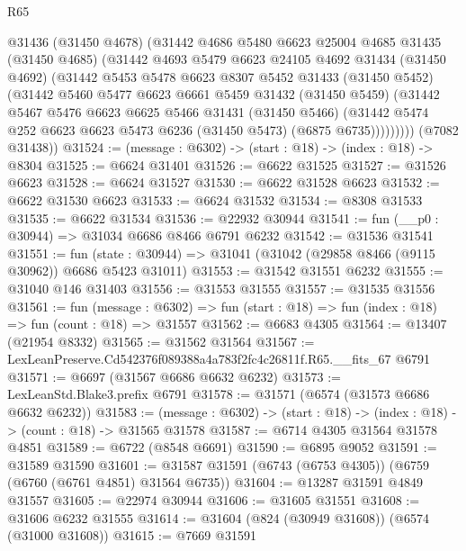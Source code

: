 \begin{lexlean}{R65}
\begin{coremodule}
{          @31436
          (@31450 @4678)
          (@31442
            @4686
            @5480
            @6623
            @25004
            @4685
            @31435
            (@31450 @4685)
            (@31442
              @4693
              @5479
              @6623
              @24105
              @4692
              @31434
              (@31450 @4692)
              (@31442
                @5453
                @5478
                @6623
                @8307
                @5452
                @31433
                (@31450 @5452)
                (@31442
                  @5460
                  @5477
                  @6623
                  @6661
                  @5459
                  @31432
                  (@31450 @5459)
                  (@31442
                    @5467
                    @5476
                    @6623
                    @6625
                    @5466
                    @31431
                    (@31450 @5466)
                    (@31442 @5474 @252 @6623 @6623 @5473 @6236 (@31450 @5473) (@6875 @6735)))))))))
      (@7082 @31438))
@31524 := (message : @6302) -> (start : @18) -> (index : @18) -> @8304
@31525 := @6624 @31401
@31526 := @6622 @31525
@31527 := @31526 @6623
@31528 := @6624 @31527
@31530 := @6622 @31528 @6623
@31532 := @6622 @31530 @6623
@31533 := @6624 @31532
@31534 := @8308 @31533
@31535 := @6622 @31534
@31536 := @22932 @30944
@31541 := fun (__p0 : @30944) => @31034 @6686 @8466 @6791 @6232
@31542 := @31536 @31541
@31551 := fun (state : @30944) => @31041 (@31042 (@29858 @8466 (@9115 @30962)) @6686 @5423 @31011)
@31553 := @31542 @31551 @6232
@31555 := @31040 @146 @31403
@31556 := @31553 @31555
@31557 := @31535 @31556
@31561 := fun (message : @6302) =>
  fun (start : @18) => fun (index : @18) => fun (count : @18) => @31557
@31562 := @6683 @4305
@31564 := @13407 (@21954 @8332)
@31565 := @31562 @31564
@31567 := LexLeanPreserve.Cd542376f089388a4a783f2fc4c26811f.R65.__fits_67 @6791
@31571 := @6697 (@31567 @6686 @6632 @6232)
@31573 := LexLeanStd.Blake3.prefix @6791
@31578 := @31571 (@6574 (@31573 @6686 @6632 @6232))
@31583 := (message : @6302) -> (start : @18) -> (index : @18) -> (count : @18) -> @31565 @31578
@31587 := @6714 @4305 @31564 @31578 @4851
@31589 := @6722 (@8548 @6691)
@31590 := @6895 @9052
@31591 := @31589 @31590
@31601 := @31587 @31591 (@6743 (@6753 @4305)) (@6759 (@6760 (@6761 @4851) @31564 @6735))
@31604 := @13287 @31591 @4849 @31557
@31605 := @22974 @30944
@31606 := @31605 @31551
@31608 := @31606 @6232 @31555
@31614 := @31604 (@824 (@30949 @31608)) (@6574 (@31000 @31608))
@31615 := @7669 @31591
}
\end{coremodule}
\end{lexlean}
